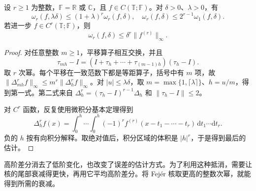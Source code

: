 \begin{proposition}\label{b2:prop:approximation-difference-estimates}
设 \(r\geq1\) 为整数，\(\mathbb F=\mathbb R\) 或 \(\mathbb C\)，且 \(f\in C(\mathbb T;\mathbb F)\)。对 \(\delta>0\)、\(\lambda>0\)，有
\[
 \omega_r(f,\lambda\delta)\leq(1+\lambda)^r\omega_r(f,\delta),
 \quad
 \omega_r(f,\delta)\leq2^{r-1}\omega_1(f,\delta).
\]
若进一步 \(f\in C^r(\mathbb T;\mathbb F)\)，则
\[
 \omega_r(f,\delta)\leq\delta^r\|f^{(r)}\|_\infty.
\]
\end{proposition}
\begin{proof}
对任意整数 \(m\geq1\)，平移算子相互交换，并且
\[
 \tau_{mh}-I=(I+\tau_h+\cdots+\tau_{(m-1)h})(\tau_h-I).
\]
取 \(r\) 次幂。每个平移在一致范数下都是等距算子，括号中有 \(m\) 项，故 \(\|\Delta_{mh}^r f\|_\infty\leq m^r\|\Delta_h^r f\|_\infty\)。对 \(|u|\leq\lambda\delta\)，取 \(m=\max\{1,\lceil\lambda\rceil\}\)、\(h=u/m\)，得到第一式。第二式来自 \(\Delta_h^r=(\tau_h-I)^{r-1}\Delta_h\) 和 \(\|\tau_h-I\|\leq2\)。

对 \(C^r\) 函数，反复使用微积分基本定理得到
\[
 \Delta_h^r f(x)=\int_0^h\cdots\int_0^h
 (-1)^rf^{(r)}(x-t_1-\cdots-t_r)\,\mathrm dt_1\cdots\mathrm dt_r.
\]
负的 \(h\) 按有向积分解释。取绝对值后，积分区域的体积是 \(|h|^r\)，于是得到最后的估计。
\end{proof}

高阶差分消去了低阶变化，也改变了误差的估计方式。为了利用这种抵消，需要让核的尾部衰减得更快，再用它平均高阶差分。将 Fejér 核取更高的整数次幂，就能得到所需的衰减。

